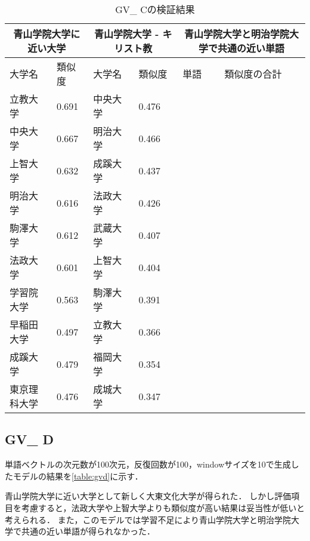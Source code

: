 \begin{table}[H]
\caption{GV\_ Cの検証結果}
\centering
\footnotesize
\begin{tabular}{ll|ll|ll}
\hline
\multicolumn{2}{c}{青山学院大学に近い大学} & \multicolumn{2}{c}{青山学院大学 - キリスト教} & \multicolumn{2}{c}{青山学院大学と明治学院大学で共通の近い単語}
\\ \hline
大学名 & 類似度 & 大学名 & 類似度 & 単語 & 類似度の合計
\\ \hline \hline
立教大学 & 0.691 & 中央大学 & 0.476 & & \\
中央大学 & 0.667 & 明治大学 & 0.466 & & \\
上智大学 & 0.632 & 成蹊大学 & 0.437 & & \\
明治大学 & 0.616 & 法政大学 & 0.426 & & \\
駒澤大学 & 0.612 & 武蔵大学 & 0.407 & & \\
法政大学 & 0.601 & 上智大学 & 0.404 & & \\
学習院大学 & 0.563 & 駒澤大学 & 0.391 & & \\
早稲田大学 & 0.497 & 立教大学 & 0.366 & & \\
成蹊大学 & 0.479 & 福岡大学 & 0.354 & & \\
東京理科大学 & 0.476 & 成城大学 & 0.347 & & \\ \hline
\end{tabular}
\label{table:gvc}
\end{table}

\subsection{GV\_ D}
単語ベクトルの次元数が100次元，反復回数が100，windowサイズを10で生成したモデルの結果を\ref{table:gvd}に示す．

青山学院大学に近い大学として新しく大東文化大学が得られた．
しかし評価項目を考慮すると，法政大学や上智大学よりも類似度が高い結果は妥当性が低いと考えられる．
また，このモデルでは学習不足により青山学院大学と明治学院大学で共通の近い単語が得られなかった．

